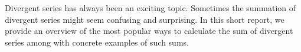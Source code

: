 Divergent series has always been an exciting topic.
Sometimes the summation of divergent series might seem confusing and surprising.
In this short report, we provide an overview of the most popular ways to calculate the sum of divergent series
among with concrete examples of such sums.